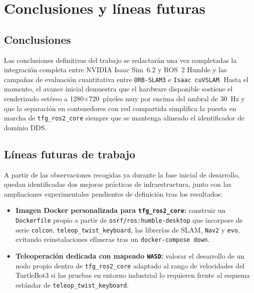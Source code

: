 \chapter{Conclusiones y líneas futuras}
\label{sec:conclusiones}

\section{Conclusiones}
\label{sec:conclusiones_texto}

Las conclusiones definitivas del trabajo se redactarán una vez completadas la integración completa entre NVIDIA Isaac Sim~6.2 y ROS~2 Humble y las campañas de evaluación cuantitativa entre \texttt{ORB-SLAM3} e \texttt{Isaac cuVSLAM}. Hasta el momento, el avance inicial demuestra que el hardware disponible sostiene el renderizado estéreo a \num{1280}\(\times\)\num{720}~píxeles muy por encima del umbral de \qty{30}{\hertz} y que la separación en contenedores con red compartida simplifica la puesta en marcha de \texttt{tfg\_ros2\_core} siempre que se mantenga alineado el identificador de dominio DDS.


\section{Líneas futuras de trabajo}
\label{sec:lineas_futuras}

A partir de las observaciones recogidas ya durante la fase inicial de desarrollo, quedan identificadas dos mejoras prácticas de infraestructura, junto con las ampliaciones experimentales pendientes de definición tras los resultados:

\begin{itemize}
  \item \textbf{Imagen Docker personalizada para \texttt{tfg\_ros2\_core}:} construir un \texttt{Dockerfile} propio a partir de \texttt{osrf/ros:humble-desktop} que incorpore de serie \texttt{colcon}, \texttt{teleop\_twist\_keyboard}, las librerías de SLAM, \texttt{Nav2} y \texttt{evo}, evitando reinstalaciones efímeras tras un \texttt{docker-compose down}.
  \item \textbf{Teleoperación dedicada con mapeado \texttt{WASD}:} valorar el desarrollo de un nodo propio dentro de \texttt{tfg\_ros2\_core} adaptado al rango de velocidades del TurtleBot3 si las pruebas en entorno industrial lo requieren frente al esquema estándar de \texttt{teleop\_twist\_keyboard}.
\end{itemize}

